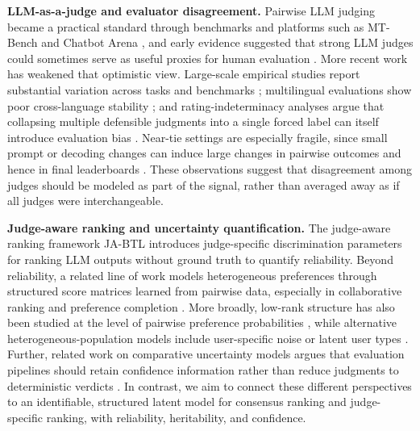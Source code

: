 \documentclass{article}
\begin{document}
\begin{bibunit}[unsrtnat]
\noindent\textbf{LLM-as-a-judge and evaluator disagreement.}
Pairwise LLM judging became a practical standard through benchmarks and platforms such as MT-Bench and Chatbot Arena \citep{zheng2023mtbench}, and early evidence suggested that strong LLM judges could sometimes serve as useful proxies for human evaluation \citep{chiang2023alternative}. 
More recent work has weakened that optimistic view. Large-scale empirical studies report substantial variation across tasks and benchmarks \citep{bavaresco2025llmjudges}; multilingual evaluations show poor cross-language stability \citep{fu2025multilingualjudge}; and rating-indeterminacy analyses argue that collapsing multiple defensible judgments into a single forced label can itself introduce evaluation bias \citep{guerdan2025indeterminacy}. 
Near-tie settings are especially fragile, since small prompt or decoding changes can induce large changes in pairwise outcomes and hence in final leaderboards \citep{gao2025reevaluating}. 
These observations suggest that disagreement among judges should be modeled as part of the signal, rather than averaged away as if all judges were interchangeable.

\noindent\textbf{Judge-aware ranking and uncertainty quantification.}
The judge-aware ranking framework JA-BTL \citep{xu2026judgeaware} introduces judge-specific discrimination parameters for ranking LLM outputs without ground truth to quantify reliability. 
Beyond reliability, a related line of work models heterogeneous preferences through structured score matrices learned from pairwise data, especially in collaborative ranking and preference completion \citep{lu2015individualized,park2015preference}. More broadly, low-rank structure has also been studied at the level of pairwise preference probabilities \citep{rajkumar2016can}, while alternative heterogeneous-population models include user-specific noise or latent user types \citep{jin2020rank,wu2015clustering}.
Further, related work on comparative uncertainty models argues that evaluation pipelines should retain confidence information rather than reduce judgments to deterministic verdicts \citep{fathullah2025comparative,wang2025judgmentdist}.
In contrast, we aim to connect these different perspectives to an identifiable, structured latent model for consensus ranking and judge-specific ranking, with reliability, heritability, and confidence.


\end{bibunit}
\end{document}
